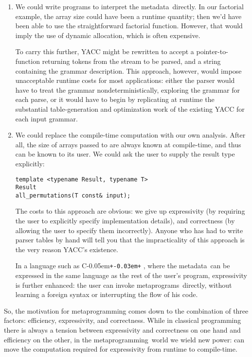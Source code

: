 \documentclass{kapproc}
\newcommand{\Cpp}{C\kern-0.05em\texttt{+\kern-0.03em+}%
}
\newcommand{\mping}{meta\-pro\-gram\-ming}
\newcommand{\mpgms}{meta\-pro\-grams}
\newcommand{\mdat}{meta\-data}
\begin{document}
\begin{enumerate}

\item We could write programs to interpret the \mdat\ directly. In
  our factorial example, the array size could have been a runtime
  quantity; then we'd have been able to use the straightforward
  factorial function. However, that would imply the use of dynamic
  allocation, which is often expensive.

  To carry this further, YACC might be rewritten to accept a
  pointer-to-function returning tokens from the stream to be parsed,
  and a string containing the grammar description. This approach,
  however, would impose unacceptable runtime costs for most
  applications: either the parser would have to treat the grammar
  nondeterministically, exploring the grammar for each parse, or it
  would have to begin by replicating at runtime the substantial
  table-generation and optimization work of the existing YACC for each
  input grammar.

\item We could replace the compile-time computation with our own
  analysis. After all, the size of arrays passed to
   are always known at compile-time, and
  thus can be known to its user. We could ask the user to supply the
  result type explicitly:
{\small
\begin{codesamp}\begin{verbatim}
template <typename Result, typename T>
Result
all_permutations(T const& input);
\end{verbatim}
\end{codesamp}
}
  The costs to this approach are obvious: we give up expressivity (by
  requiring the user to explicitly specify implementation details),
  and correctness (by allowing the user to specify them
  incorrectly). Anyone who has had to write parser tables by hand will
  tell you that the impracticality of this approach is the very reason
  YACC's existence.

  In a language such as \Cpp, where the \mdat\ can be expressed in
  the same language as the rest of the user's program, expressivity is
  further enhanced: the user can invoke \mpgms\ directly, without
  learning a foreign syntax or interrupting the flow of his code.
\end{enumerate}

So, the motivation for \mping{} comes down to the combination of three
factors: efficiency, expressivity, and correctness. While in classical
programming there is always a tension between expressivity and
correctness on one hand and efficiency on the other, in the \mping\
world we wield new power: can move the computation required for
expressivity from runtime to compile-time.
\end{document}
